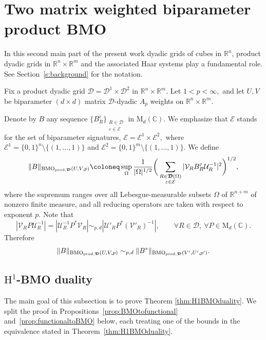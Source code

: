 \documentclass{article}
\theoremstyle{definition}
\theoremstyle{remark}
\numberwithin{equation}{section}
\newcommand{\cD}{\mathcal{D}}
\newcommand{\cE}{\mathcal{E}}
\newcommand{\cU}{\mathcal{U}}
\newcommand{\cV}{\mathcal{V}}
\newcommand{\bfD}{\bm{\mathcal{D}}}
\newcommand{\e}{\varepsilon}
\newcommand{\reals}{\mathbb{R}}
\newcommand{\complex}{\mathbb{C}}
\newcommand{\1}{\mathbf{1}}
\newcommand{\BMOprodD}{\ensuremath\text{BMO}_{\text{prod},\bfD}}
\begin{document}
    \section{Two matrix weighted biparameter product BMO}
    \label{s:MatrixWeighedProductBMO}

    In this second main part of the present work dyadic grids of cubes in $\reals^n$, product dyadic grids in $\reals^n\times\reals^m$ and the associated Haar systems play a fundamental role. See Section~\ref{s:background} for the notation.

    Fix a product dyadic grid $\bfD=\cD^1\times\cD^2$ in $\reals^n\times\reals^m.$ Let $1<p<\infty,$ and let $U,V$ be biparameter $(d\times d)$ matrix $\bfD$-dyadic $A_p$ weights on $\reals^n\times\reals^m.$

    Denote by $B$ any sequence $\{B_{R}^{\e}\}_{\substack{R\in\bfD\\\e\in\cE}}$ in $\mathrm{M}_{d}(\complex).$ We emphasize that $\cE$ stands for the set of biparameter signatures, $\cE=\cE^1\times\cE^2,$ where $\cE^1=\{0,1\}^{n}\setminus\{(1,\ldots,1)\}$ and $\cE^2=\{0,1\}^m\setminus\{(1,\ldots,1)\}.$ We define
    \begin{equation*}
        \Vert B\Vert_{\BMOprodD(U,V,p)}\coloneq \sup_{\Omega}\frac{1}{|\Omega|^{1/2}}\bigg(\sum_{\substack{R\in\bfD(\Omega)\\\e\in\cE}}|\cV_{R}B_{R}^{\e}\cU_{R}^{-1}|^2\bigg)^{1/2},
    \end{equation*}
    where the supremum ranges over all Lebesgue-measurable subsets $\Omega$ of $\reals^{n+m}$ of nonzero finite measure, and all reducing operators are taken with respect to exponent $p.$ Note that
    \begin{equation*}
        |\cV_{R}P\cU^{-1}_{R}|=|\cU^{-1}_{R}P^{\ast}\cV_{R}|\sim_{p,d}|\cU'_{R}P^{\ast}(\cV'_{R})^{-1}|,\qquad\forall R\in\bfD,~\forall P\in \mathrm{M}_{d}(\complex).
    \end{equation*}
    Therefore
    \begin{equation*}
        \Vert B\Vert_{\BMOprodD(U,V,p)}\sim_{p,d}\Vert B^{\ast}\Vert_{\BMOprodD(V',U',p')}.
    \end{equation*}

    \subsection{\texorpdfstring{$\mathrm{H}^1$-BMO duality}{H1-BMO duality}} The main goal of this subsection is to prove Theorem \ref{thm:H1BMOduality}. We split the proof in Propositions~\ref{prop:BMOtofunctional} and~\ref{prop:functionaltoBMO} below, each treating one of the bounds in the equivalence stated in Theorem~\ref{thm:H1BMOduality}.
\end{document}
